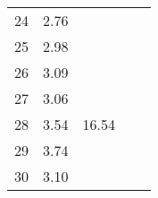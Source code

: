 \begin{center}
\begin{tabular}{| l || c | c | c | c |}
24 & \multirow{1}{*}{ 2.76 }  & & & \\\cline{2-2}
25 & \multirow{1}{*}{ 2.98 }  & & & \\\cline{2-2}\cline{3-3}
26 & \multirow{1}{*}{ 3.09 }  & \multirow{5}{*}{ 16.54 }  & & \\\cline{2-2}
27 & \multirow{1}{*}{ 3.06 }  & & & \\\cline{2-2}
28 & \multirow{1}{*}{ 3.54 }  & & & \\\cline{2-2}
29 & \multirow{1}{*}{ 3.74 }  & & & \\\cline{2-2}
30 & \multirow{1}{*}{ 3.10 }  & & & \\\cline{2-2}\cline{3-3}\cline{4-4}\cline{5-5}
\hline\end{tabular}
\end{center}